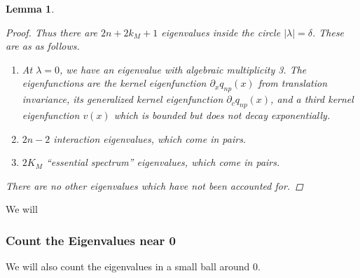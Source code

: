 \documentclass[12pt]{article}
\newtheorem{lemma}{Lemma}
\begin{document}
\begin{lemma}
\begin{proof}
Thus there are $2n + 2 k_M + 1$ eigenvalues inside the circle $|\lambda| = \delta$. These are as as follows.
\begin{enumerate}
	\item At $\lambda = 0$, we have an eigenvalue with algebraic multiplicity 3. The eigenfunctions are the kernel eigenfunction $\partial_x q_{np}(x)$ from translation invariance, its generalized kernel eigenfunction $\partial_c q_{np}(x)$, and a third kernel eigenfunction $v(x)$ which is bounded but does not decay exponentially.
	\item $2n - 2$ interaction eigenvalues, which come in pairs.
	\item $2 K_M$ ``essential spectrum'' eigenvalues, which come in pairs.
\end{enumerate}

There are no other eigenvalues which have not been accounted for.
\end{proof}
\end{lemma}

We will

\subsubsection{Count the Eigenvalues near 0}

We will also count the eigenvalues in a small ball around 0.  
\end{document}
